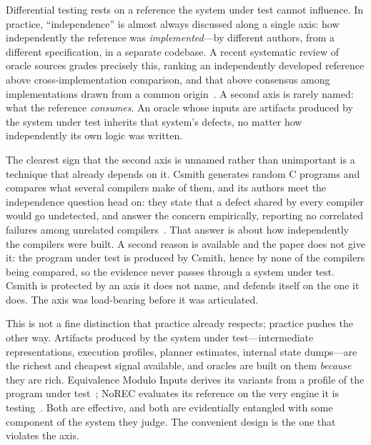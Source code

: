 Differential testing rests on a reference the system under test cannot influence.
In practice, ``independence'' is almost always discussed along a single axis: how
independently the reference was \emph{implemented}---by different authors, from a
different specification, in a separate codebase. A recent systematic review of
oracle sources grades precisely this, ranking an independently developed reference
above cross-implementation comparison, and that above consensus among
implementations drawn from a common origin~\cite{oraclesurvey2026}. A second axis
is rarely named: what the reference \emph{consumes}. An oracle whose inputs are
artifacts produced by the system under test inherits that system's defects, no
matter how independently its own logic was written.

The clearest sign that the second axis is unnamed rather than unimportant is a
technique that already depends on it. Csmith generates random C programs and compares
what several compilers make of them, and its authors meet the independence question
head on: they state that a defect shared by every compiler would go undetected, and
answer the concern empirically, reporting no correlated failures among unrelated
compilers~\cite{yang2011csmith}. That answer is about how independently the compilers
were built. A second reason is available and the paper does not give it: the program
under test is produced by Csmith, hence by none of the compilers being compared, so
the evidence never passes through a system under test. Csmith is protected by an axis
it does not name, and defends itself on the one it does. The axis was load-bearing
before it was articulated.

This is not a fine distinction that practice already respects; practice pushes the
other way. Artifacts produced by the system under test---intermediate
representations, execution profiles, planner estimates, internal state dumps---are
the richest and cheapest signal available, and oracles are built on them
\emph{because} they are rich. Equivalence Modulo Inputs derives its variants from a
profile of the program under test~\cite{le2014emi}; NoREC evaluates its reference on
the very engine it is testing~\cite{rigger2020norec}. Both are effective, and both
are evidentially entangled with some component of the system they judge. The
convenient design is the one that violates the axis.

